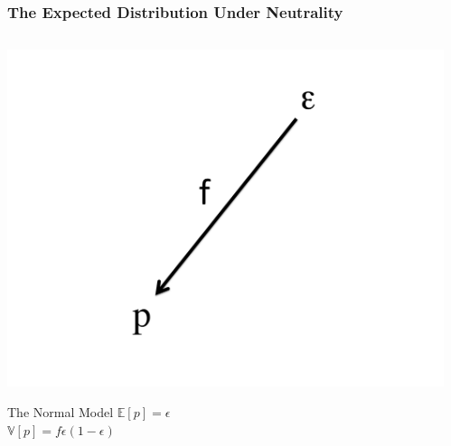 \documentclass{beamer}
\begin{document}
\begin{frame}
	\frametitle	{The Expected Distribution Under Neutrality}
	\begin{columns}
		\begin{column}{0.3 \textwidth}
			\includegraphics[height =
                        \textwidth]{../figs/OneBranch.pdf}

					\begin{block}{The Normal Model}
						$\mathbb{E}\left[p\right] = \epsilon$ \\
						\vskip 0.4cm
						$\mathbb{V}\left[p\right] = f \epsilon ( 1 - \epsilon )$
					\end{block}

		\end{column}
		\begin{column}{0.45\textwidth}


\end{column}
\end{columns}
\end{frame}
\end{document}
